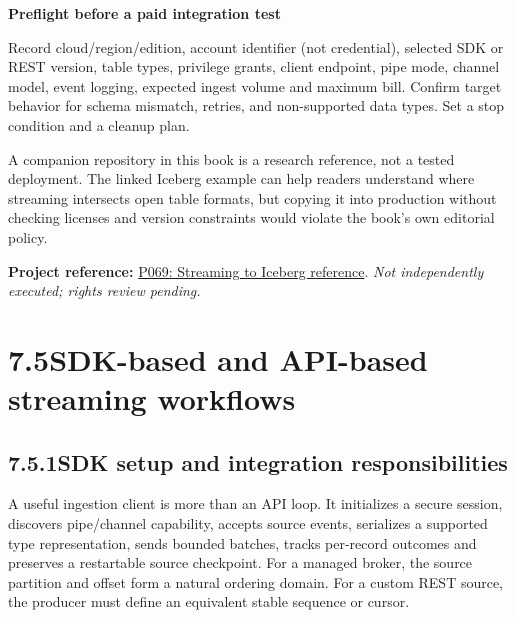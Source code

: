 \documentclass[11pt,twoside]{article}
\newcommand{\topic}[2]{\subsection*{#1\quad #2}}
\newcommand{\repo}[2]{\par\begingroup\fontsize{8.0}{9.6}\selectfont\sffamily\color{inkgray}\textbf{Project reference:} \href{#2}{#1}. \textit{Not independently executed; rights review pending.}\par\endgroup}
\begin{document}
\begin{whitebox}\textbf{Preflight before a paid integration test}\par
Record cloud/region/edition, account identifier (not credential), selected SDK or REST version, table types, privilege grants, client endpoint, pipe mode, channel model, event logging, expected ingest volume and maximum bill. Confirm target behavior for schema mismatch, retries, and non-supported data types. Set a stop condition and a cleanup plan.\end{whitebox}
A companion repository in this book is a research reference, not a tested deployment. The linked Iceberg example can help readers understand where streaming intersects open table formats, but copying it into production without checking licenses and version constraints would violate the book's own editorial policy.
\repo{P069: Streaming to Iceberg reference}{https://github.com/Snowflake-Labs/sfguide-getting-started-with-snowpipe-streaming-apache-iceberg-snowflake-open-catalog}
\newpage
\section*{7.5\quad SDK-based and API-based streaming workflows}
\topic{7.5.1}{SDK setup and integration responsibilities}
A useful ingestion client is more than an API loop. It initializes a secure session, discovers pipe/channel capability, accepts source events, serializes a supported type representation, sends bounded batches, tracks per-record outcomes and preserves a restartable source checkpoint. For a managed broker, the source partition and offset form a natural ordering domain. For a custom REST source, the producer must define an equivalent stable sequence or cursor.
\end{document}
